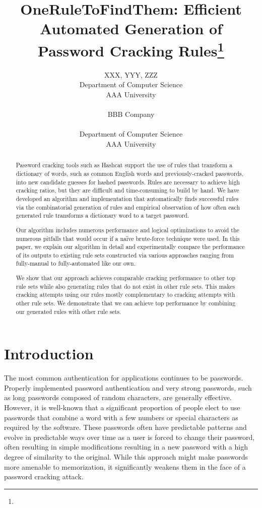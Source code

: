 \documentclass{article}
\title{OneRuleToFindThem: Efficient Automated Generation of Password Cracking Rules\footnote{\protect}
}
\author{
    XXX\affmark[1], YYY\affmark[2], ZZZ\affmark[3]\\
\affmark[1]Department of Computer Science\\
AAA University\\
\email{III@III.III}\\
\affmark[2]
BBB Company\\
\email{JJJ@JJJ.JJJ}\\
\affmark[3]Department of Computer Science\\
AAA University\\
\email{LLL@LLL.LLL}
}
\begin{document}
\maketitle

\begin{abstract}
Password cracking tools such as Hashcat support the use of rules that transform
a dictionary of words, such as common English words and previously-cracked
passwords, into new candidate guesses for hashed passwords. Rules are necessary
to achieve high cracking ratios, but they are difficult and time-consuming
to build by hand. We have developed an algorithm and implementation that
automatically finds successful rules via the combinatorial generation of rules
and empirical observation of how often each generated rule transforms a
dictionary word to a target password.

Our algorithm includes numerous performance and logical optimizations to avoid the
numerous pitfalls that would occur if a na\"ive brute-force technique were used.
In this paper, we explain our algorithm in detail and experimentally compare the
performance of its outputs to existing rule sets constructed via various
approaches ranging from fully-manual to fully-automated like our own.

We show that our approach achieves comparable
cracking performance to other top rule sets while also generating rules that do
not exist in other rule sets. This makes cracking attempts using our rules
mostly complementary to cracking attempts with other rule sets. We
demonstrate that we can achieve top performance
by combining our generated rules with other rule sets.
\end{abstract}

\section{Introduction}

The most common
authentication for applications continues to be passwords. Properly implemented password
authentication and very strong passwords,
such as long passwords composed of random characters, are
generally effective. However, it is well-known that a significant proportion of
people elect to use passwords that combine a word with a few numbers or
special characters as required by the software. These passwords often
have predictable patterns and evolve in predictable ways over time as a user is
forced to change their password, often resulting in simple modifications
resulting in a new password with a high degree of similarity to the
original\autocite{hanamsagar2018leveraging}. While this approach might make
passwords more amenable to memorization, it significantly weakens them in the
face of a password cracking attack.
\end{document}
